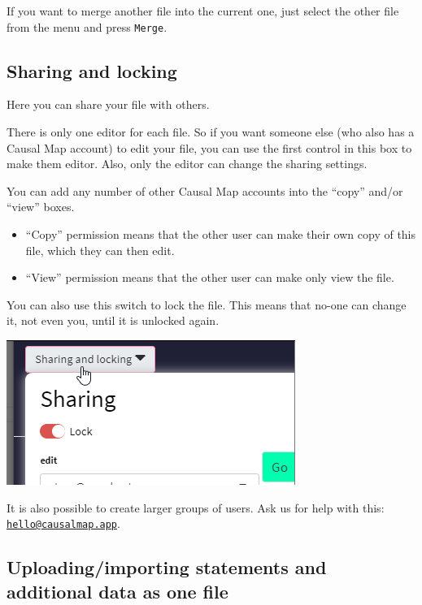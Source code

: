 \documentclass[
]{book}
\begin{document}
If you want to merge another file into the current one, just select the other file from the menu and press \texttt{Merge}.

\hypertarget{sharing}{%
\subsection{Sharing and locking}\label{sharing}}

Here you can share your file with others.

There is only one editor for each file. So if you want someone else (who also has a Causal Map account) to edit your file, you can use the first control in this box to make them editor. Also, only the editor can change the sharing settings.

You can add any number of other Causal Map accounts into the ``copy'' and/or ``view'' boxes.

\begin{itemize}
\item
  ``Copy'' permission means that the other user can make their own copy of this file, which they can then edit.
\item
  ``View'' permission means that the other user can make only view the file.
\end{itemize}

You can also use this switch to lock the file. This means that no-one can change it, not even you, until it is unlocked again.

\includegraphics{_assets/110002.png}

It is also possible to create larger groups of users. Ask us for help with this: \href{mailto:hello@causalmap.app}{\nolinkurl{hello@causalmap.app}}.

\hypertarget{uploadingimporting-statements-and-additional-data-as-one-file}{%
\subsection{Uploading/importing statements and additional data as one file}\label{uploadingimporting-statements-and-additional-data-as-one-file}}
\end{document}
